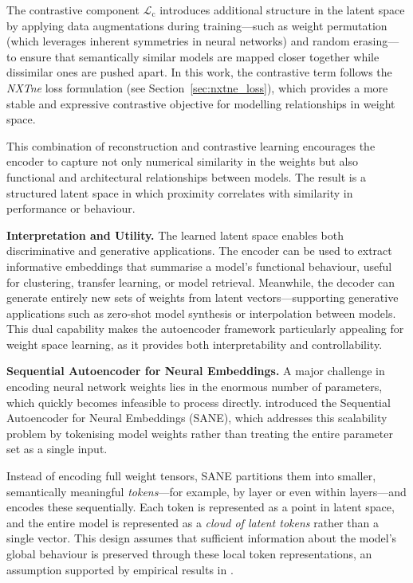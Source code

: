 The contrastive component $\mathcal{L}_{\text{c}}$ introduces additional structure in the latent space by applying data augmentations during training—such as weight permutation (which leverages inherent symmetries in neural networks) and random erasing—to ensure that semantically similar models are mapped closer together while dissimilar ones are pushed apart. In this work, the contrastive term follows the \textit{NXTne} loss formulation (see Section~\ref{sec:nxtne_loss}), which provides a more stable and expressive contrastive objective for modelling relationships in weight space.


This combination of reconstruction and contrastive learning encourages the encoder to capture not only numerical similarity in the weights but also functional and architectural relationships between models. The result is a structured latent space in which proximity correlates with similarity in performance or behaviour.

\vspace{0.5em}
\noindent
\textbf{Interpretation and Utility.}
The learned latent space enables both discriminative and generative applications. The encoder can be used to extract informative embeddings that summarise a model’s functional behaviour, useful for clustering, transfer learning, or model retrieval. Meanwhile, the decoder can generate entirely new sets of weights from latent vectors—supporting generative applications such as zero-shot model synthesis or interpolation between models. This dual capability makes the autoencoder framework particularly appealing for weight space learning, as it provides both interpretability and controllability.

\vspace{1em}
\noindent
\textbf{Sequential Autoencoder for Neural Embeddings.}
A major challenge in encoding neural network weights lies in the enormous number of parameters, which quickly becomes infeasible to process directly. \cite{pmlr-v235-schurholt24a} introduced the Sequential Autoencoder for Neural Embeddings (SANE), which addresses this scalability problem by tokenising model weights rather than treating the entire parameter set as a single input.  

Instead of encoding full weight tensors, SANE partitions them into smaller, semantically meaningful \textit{tokens}—for example, by layer or even within layers—and encodes these sequentially. Each token is represented as a point in latent space, and the entire model is represented as a \textit{cloud of latent tokens} rather than a single vector. This design assumes that sufficient information about the model’s global behaviour is preserved through these local token representations, an assumption supported by empirical results in \cite{pmlr-v235-schurholt24a}.

